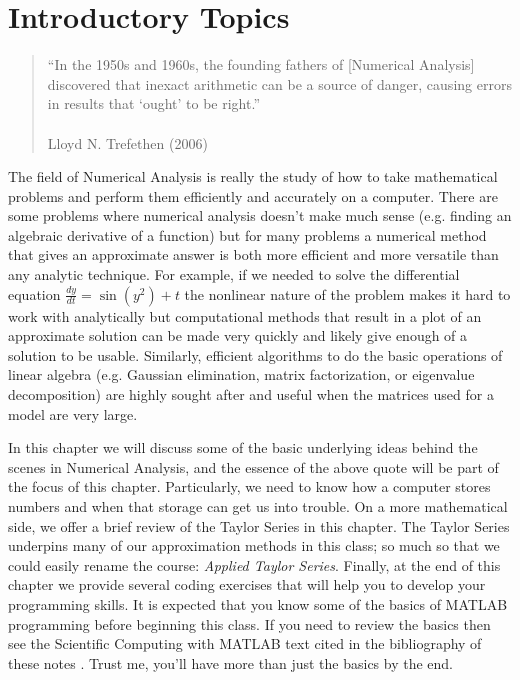 \chapter{Introductory Topics}
\begin{quote}
    ``In the 1950s and 1960s, the founding fathers of [Numerical Analysis] discovered that inexact
    arithmetic can be a source of danger, causing errors in results that `ought' to be
    right.'' \\
    \\ Lloyd N. Trefethen (2006)
\end{quote}

The field of Numerical Analysis is really the study of how to take
mathematical problems and perform them efficiently and accurately on a computer.  There
are some problems where numerical analysis doesn't make much sense (e.g. finding an
algebraic derivative of a function) but for many problems a numerical method that gives an
approximate answer is both more efficient and more versatile than any analytic technique.
For example, if we needed to solve the differential equation $\frac{dy}{dt} = \sin(y^2) +
t$ the nonlinear nature of the problem makes it hard to work with analytically but
computational methods that result in a plot of an approximate solution can be made very
quickly and likely give enough of a solution to be usable.  Similarly, efficient
algorithms to do the basic operations of linear algebra (e.g. Gaussian elimination, matrix
factorization, or eigenvalue decomposition) are highly sought after and useful when
the matrices used for a model are very large. 

In this chapter we will discuss some of the basic underlying ideas behind the scenes in
Numerical Analysis, and the essence of the  above quote will be part of the focus of this chapter.
Particularly, we need to know how a computer stores numbers and when that storage can get
us into trouble.  On a more mathematical side, we offer a brief review of the Taylor
Series in this chapter. The Taylor Series underpins many of our approximation methods in
this class; so much so that we could easily rename the course: {\it Applied Taylor
Series}.  Finally, at the end of this chapter we provide several coding exercises that
will help you to develop your programming skills.  It is expected that you know some of
the basics of MATLAB programming before beginning this class.  If you need to review the
basics then see the Scientific Computing with MATLAB text cited in the bibliography of
these notes \cite{SciCompMATLAB}.  Trust me, you'll have more
than just the basics by the end.

